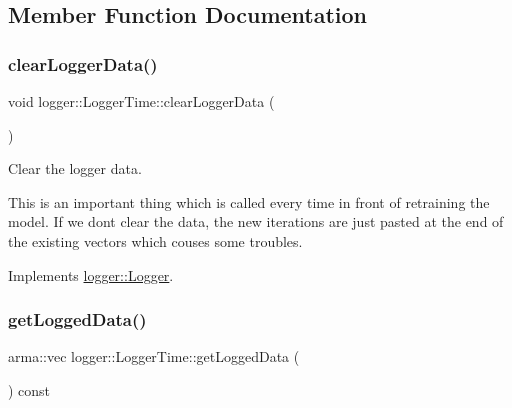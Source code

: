 \subsection{Member Function Documentation}
\mbox{\label{classlogger_1_1_logger_time_a0bcce74556cf50de86b8d7333d82e919}} 
\subsubsection{\texorpdfstring{clear\+Logger\+Data()}{clearLoggerData()}}
{\footnotesize\ttfamily void logger\+::\+Logger\+Time\+::clear\+Logger\+Data (\begin{DoxyParamCaption}{ }\end{DoxyParamCaption})\hspace{0.3cm}{\ttfamily [virtual]}}



Clear the logger data. 

This is an important thing which is called every time in front of retraining the model. If we don\textquotesingle{}t clear the data, the new iterations are just pasted at the end of the existing vectors which couses some troubles. 

Implements \mbox{\hyperlink{classlogger_1_1_logger_a8c68db2430fa84b67528bfa6ae45a516}{logger\+::\+Logger}}.

\mbox{\label{classlogger_1_1_logger_time_a8723a078c86c1470208dccadffed5c1b}} 
\subsubsection{\texorpdfstring{get\+Logged\+Data()}{getLoggedData()}}
{\footnotesize\ttfamily arma\+::vec logger\+::\+Logger\+Time\+::get\+Logged\+Data (\begin{DoxyParamCaption}{ }\end{DoxyParamCaption}) const\hspace{0.3cm}{\ttfamily [virtual]}}



